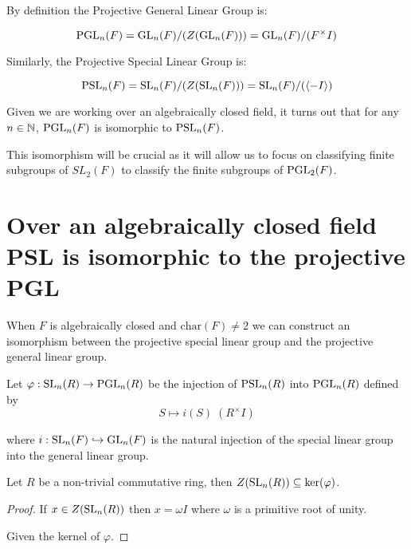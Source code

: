 By definition the Projective General Linear Group is:

\begin{equation}
    \operatorname{PGL}_n(F) = \operatorname{GL}_n(F) / (Z(\operatorname{GL}_n(F))) = \operatorname{GL}_n(F) / (F^\times I) 
\end{equation}

Similarly, the Projective Special Linear Group is:

\begin{equation}
    \operatorname{PSL}_n(F) = \operatorname{SL}_n(F) / (Z(\operatorname{SL}_n(F))) = \operatorname{SL}_n(F) / (\langle -I\rangle)
\end{equation}

Given we are working over an algebraically closed field, it turns out that for any $n \in \mathbb{N}$, $\operatorname{PGL}_n(F)$ is isomorphic to $\operatorname{PSL}_n(F)$.

This isomorphism will be crucial as it will allow us to focus on classifying finite subgroups of $SL_2(F)$ to classify the finite subgroups of $\operatorname{PGL}_2(F)$.

\section{Over an algebraically closed field PSL is isomorphic to the projective PGL}


When $F$ is algebraically closed and $\textrm{char}(F) \neq 2$ we can construct an isomorphism between the projective special linear group and the projective general linear group.
\begin{definition}
\label{SL_monoidHom_PGL}
\leanok
    Let $\varphi : \operatorname{SL}_n(R) \rightarrow \operatorname{PGL}_n(R)$ be the injection of $\operatorname{PSL}_n(R)$ into $\operatorname{PGL}_n(R)$ defined by
    \[
     S \mapsto i(S) \;  (R^\times I) 
    \]

    where $i : \operatorname{SL}_n(F) \hookrightarrow \operatorname{GL}_n(F)$ is the natural injection of the special linear group into the general linear group.
\end{definition}

\begin{lemma}
\label{center_SL_le_ker}
\leanok
Let $R$ be a non-trivial commutative ring, then $Z(\operatorname{SL}_n(R)) \subseteq \ker (\varphi)$.
\end{lemma}

\begin{proof}
If $x \in Z(\operatorname{SL}_n(R))$ then $x = \omega I$ where $\omega$ is a primitive root of unity.

Given the kernel of $\varphi$.
\end{proof}



